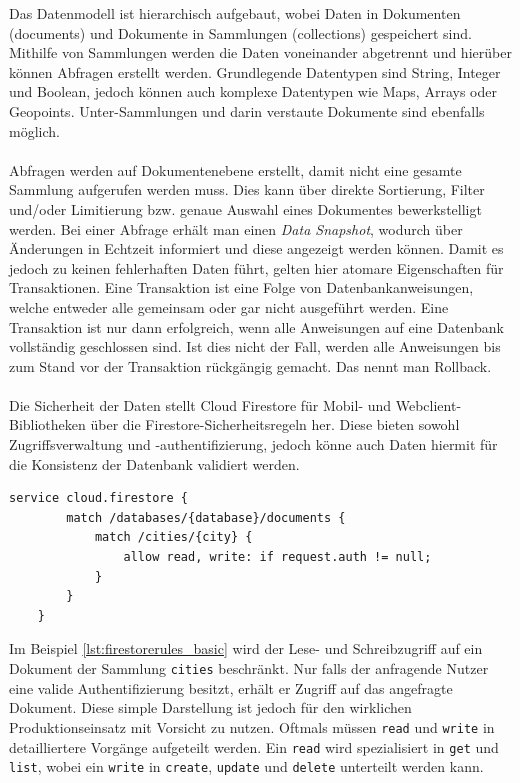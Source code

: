 \noindent
Das Datenmodell ist hierarchisch aufgebaut, wobei Daten in Dokumenten (documents) und Dokumente in Sammlungen (collections) gespeichert sind. 
Mithilfe von Sammlungen werden die Daten voneinander abgetrennt und hierüber können Abfragen erstellt werden.
Grundlegende Datentypen sind String, Integer und Boolean, jedoch können auch komplexe Datentypen wie Maps, Arrays oder Geopoints. Unter-Sammlungen und darin verstaute Dokumente sind ebenfalls möglich.\\
\\
Abfragen werden auf Dokumentenebene erstellt, damit nicht eine gesamte Sammlung aufgerufen werden muss.
Dies kann über direkte Sortierung, Filter und/oder Limitierung bzw. genaue Auswahl eines Dokumentes bewerkstelligt werden.
Bei einer Abfrage erhält man einen \textit{Data Snapshot}, wodurch über Änderungen in Echtzeit informiert und diese angezeigt werden können.
Damit es jedoch zu keinen fehlerhaften Daten führt, gelten hier atomare Eigenschaften für Transaktionen.
Eine Transaktion ist eine Folge von Datenbankanweisungen, welche entweder alle gemeinsam oder gar nicht ausgeführt werden. 
Eine Transaktion ist nur dann erfolgreich, wenn alle Anweisungen auf eine Datenbank vollständig geschlossen sind. 
Ist dies nicht der Fall, werden alle Anweisungen bis zum Stand vor der Transaktion rückgängig gemacht. Das nennt man Rollback.\\
\\
Die Sicherheit der Daten stellt Cloud Firestore für Mobil- und Webclient-Bibliotheken über die Firestore-Sicherheitsregeln her. Diese bieten sowohl Zugriffsverwaltung und -authentifizierung, jedoch könne auch Daten hiermit für die Konsistenz der Datenbank validiert werden. 
\medskip
\begin{lstlisting}[caption=Beschränkung des Zugriffs auf Dokumente der Sammlung \texttt{cities}, label=lst:firestorerules_basic]
	service cloud.firestore {
		match /databases/{database}/documents {
			match /cities/{city} {
				allow read, write: if request.auth != null;
			}
		}
	}
\end{lstlisting}
\medskip
Im Beispiel \ref{lst:firestorerules_basic} wird der Lese- und Schreibzugriff auf ein Dokument der Sammlung \texttt{cities} beschränkt. 
Nur falls der anfragende Nutzer eine valide Authentifizierung besitzt, erhält er Zugriff auf das angefragte Dokument. 
Diese simple Darstellung ist jedoch für den wirklichen Produktionseinsatz mit Vorsicht zu nutzen. 
Oftmals müssen \texttt{read} und \texttt{write} in detailliertere Vorgänge aufgeteilt werden. Ein \texttt{read} wird spezialisiert in \texttt{get} und \texttt{list}, wobei ein \texttt{write} in \texttt{create}, \texttt{update} und \texttt{delete} unterteilt werden kann.
